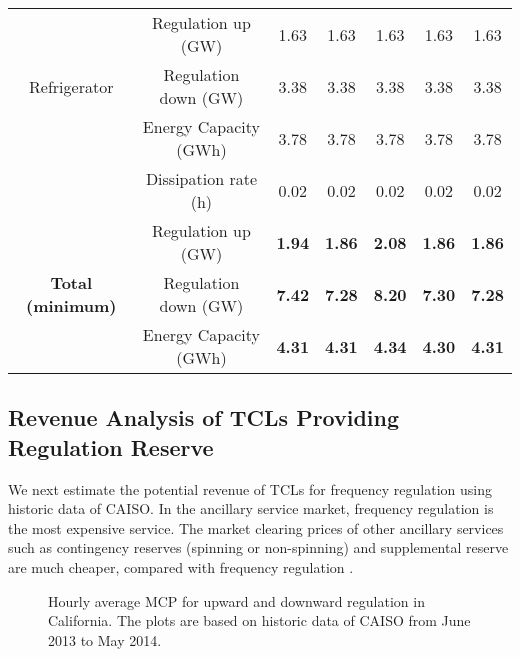 \documentclass[onecolumn,journal]{IEEEtran}
\begin{document}
\begin{table}[tb]
{\begin{tabular}{c c|| c| c | c | c | c}
\hline
\multirow{3}{*}{Refrigerator} & Regulation up  (GW) &  1.63 & 1.63 & 1.63 & 1.63 &1.63 \\
 & Regulation down (GW)  &  3.38 & 3.38 & 3.38 & 3.38 &3.38 \\
 & Energy Capacity (GWh) &  3.78 & 3.78 & 3.78 & 3.78 &3.78 \\
  & Dissipation rate (h) & 0.02 & 0.02 & 0.02 & 0.02 & 0.02 \\
\hline \hline
 \multirow{3}{*}{\textbf{Total (minimum)}} & Regulation up  (GW) &  \textbf{1.94} & \textbf{1.86} & \textbf{2.08} & \textbf{1.86} & \textbf{1.86} \\
 & Regulation down (GW)  &  \textbf{7.42} & \textbf{7.28} & \textbf{8.20} & \textbf{7.30} & \textbf{7.28} \\
 & Energy Capacity (GWh) &  \textbf{4.31} & \textbf{4.31} & \textbf{4.34} & \textbf{4.30} & \textbf{4.31}
\end{tabular}}
\end{table}

\subsection{Revenue Analysis of \acp{TCL} Providing Regulation Reserve}
We next estimate the potential revenue of \acp{TCL} for frequency regulation using historic data of CAISO. In the ancillary service market, frequency regulation is the most expensive service. The market clearing prices of other ancillary services such as contingency reserves (spinning or non-spinning) and supplemental reserve are much cheaper, compared with frequency regulation \cite{AS_Kirby}.

\begin{figure}[tb]
\centering
{}
\caption{Hourly average MCP for upward and downward regulation in California. The plots are based on historic data of CAISO from June 2013 to May 2014.}\label{fig:price}
\end{figure}
\end{document}

